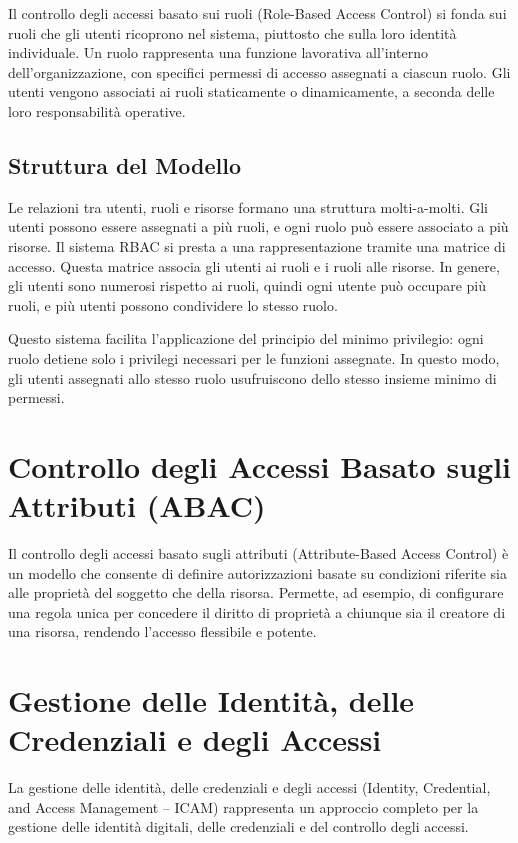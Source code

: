 Il controllo degli accessi basato sui ruoli (Role-Based Access Control) si fonda sui ruoli che gli utenti ricoprono nel sistema, piuttosto che sulla loro identità individuale. Un ruolo rappresenta una funzione lavorativa all'interno dell'organizzazione, con specifici permessi di accesso assegnati a ciascun ruolo. Gli utenti vengono associati ai ruoli staticamente o dinamicamente, a seconda delle loro responsabilità operative.

\subsection{Struttura del Modello}

Le relazioni tra utenti, ruoli e risorse formano una struttura molti-a-molti. Gli utenti possono essere assegnati a più ruoli, e ogni ruolo può essere associato a più risorse. Il sistema RBAC si presta a una rappresentazione tramite una matrice di accesso. Questa matrice associa gli utenti ai ruoli e i ruoli alle risorse. In genere, gli utenti sono numerosi rispetto ai ruoli, quindi ogni utente può occupare più ruoli, e più utenti possono condividere lo stesso ruolo.

Questo sistema facilita l'applicazione del principio del minimo privilegio: ogni ruolo detiene solo i privilegi necessari per le funzioni assegnate. In questo modo, gli utenti assegnati allo stesso ruolo usufruiscono dello stesso insieme minimo di permessi.

\section{Controllo degli Accessi Basato sugli Attributi (ABAC)}

Il controllo degli accessi basato sugli attributi (Attribute-Based Access Control) è un modello che consente di definire autorizzazioni basate su condizioni riferite sia alle proprietà del soggetto che della risorsa. Permette, ad esempio, di configurare una regola unica per concedere il diritto di proprietà a chiunque sia il creatore di una risorsa, rendendo l'accesso flessibile e potente.

\section{Gestione delle Identità, delle Credenziali e degli Accessi}

La gestione delle identità, delle credenziali e degli accessi (Identity, Credential, and Access Management -- ICAM) rappresenta un approccio completo per la gestione delle identità digitali, delle credenziali e del controllo degli accessi.

